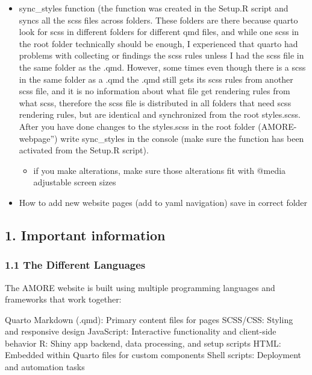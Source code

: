 \documentclass[
  letterpaper,
  DIV=11,
  numbers=noendperiod]{scrartcl}
\providecommand{\tightlist}{%
  \setlength{\itemsep}{0pt}\setlength{\parskip}{0pt}}\usepackage{longtable,booktabs,array}
\begin{document}
\begin{enumerate}
\begin{enumerate}
    \begin{itemize}
    \item
      sync\_styles function (the function was created in the Setup.R
      script and syncs all the scss files across folders. These folders
      are there because quarto look for scss in different folders for
      different qmd files, and while one scss in the root folder
      technically should be enough, I experienced that quarto had
      problems with collecting or findings the scss rules unless I had
      the scss file in the same folder as the .qmd. However, some times
      even though there is a scss in the same folder as a .qmd the .qmd
      still gets its scss rules from another scss file, and it is no
      information about what file get rendering rules from what scss,
      therefore the scss file is distributed in all folders that need
      scss rendering rules, but are identical and synchronized from the
      root styles.scss. After you have done changes to the styles.scss
      in the root folder (AMORE-webpage'') write sync\_styles in the
      console (make sure the function has been activated from the
      Setup.R script).

      \begin{itemize}
      \tightlist
      \item
        if you make alterations, make sure those alterations fit with
        @media adjustable screen sizes
      \end{itemize}
    \item
      How to add new website pages (add to yaml navigation) save in
      correct folder
    \end{itemize}
  \end{enumerate}
\end{enumerate}

\subsection{1. Important information}\label{important-information}

\subsubsection{1.1 The Different
Languages}\label{the-different-languages}

The AMORE website is built using multiple programming languages and
frameworks that work together:

Quarto Markdown (.qmd): Primary content files for pages SCSS/CSS:
Styling and responsive design JavaScript: Interactive functionality and
client-side behavior R: Shiny app backend, data processing, and setup
scripts HTML: Embedded within Quarto files for custom components Shell
scripts: Deployment and automation tasks
\end{document}
